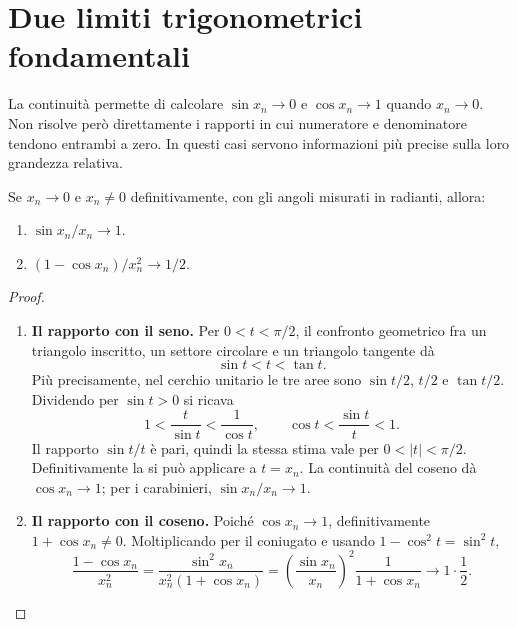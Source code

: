 \section{Due limiti trigonometrici fondamentali}
\label{sec:limiti-trigonometrici}

La continuità permette di calcolare $\sin x_n\to0$ e $\cos x_n\to1$ quando $x_n\to0$. Non risolve però direttamente i rapporti in cui numeratore e denominatore tendono entrambi a zero. In questi casi servono informazioni più precise sulla loro grandezza relativa.

\begin{teorema}
Se $x_n\to0$ e $x_n\ne0$ definitivamente, con gli angoli misurati in radianti, allora:
\begin{enumerate}[label=\arabic*.]
\item $\sin x_n/x_n\to1$.
\item $(1-\cos x_n)/x_n^2\to1/2$.
\end{enumerate}
\end{teorema}
\begin{proof}
\begin{enumerate}[label=\arabic*.]
\item \textbf{Il rapporto con il seno.} Per $0<t<\pi/2$, il confronto geometrico fra un triangolo inscritto, un settore circolare e un triangolo tangente dà
\[
\sin t<t<\tan t.
\]
Più precisamente, nel cerchio unitario le tre aree sono $\sin t/2$, $t/2$ e $\tan t/2$. Dividendo per $\sin t>0$ si ricava
\[
1<\frac{t}{\sin t}<\frac1{\cos t},
\qquad
\cos t<\frac{\sin t}{t}<1.
\]
Il rapporto $\sin t/t$ è pari, quindi la stessa stima vale per $0<|t|<\pi/2$. Definitivamente la si può applicare a $t=x_n$. La continuità del coseno dà $\cos x_n\to1$; per i carabinieri, $\sin x_n/x_n\to1$.
\item \textbf{Il rapporto con il coseno.} Poiché $\cos x_n\to1$, definitivamente $1+\cos x_n\ne0$. Moltiplicando per il coniugato e usando $1-\cos^2t=\sin^2t$,
\[
\frac{1-\cos x_n}{x_n^2}
=\frac{\sin^2x_n}{x_n^2(1+\cos x_n)}
=\left(\frac{\sin x_n}{x_n}\right)^2\frac1{1+\cos x_n}
\longrightarrow1\cdot\frac12.
\]
\end{enumerate}
\end{proof}

